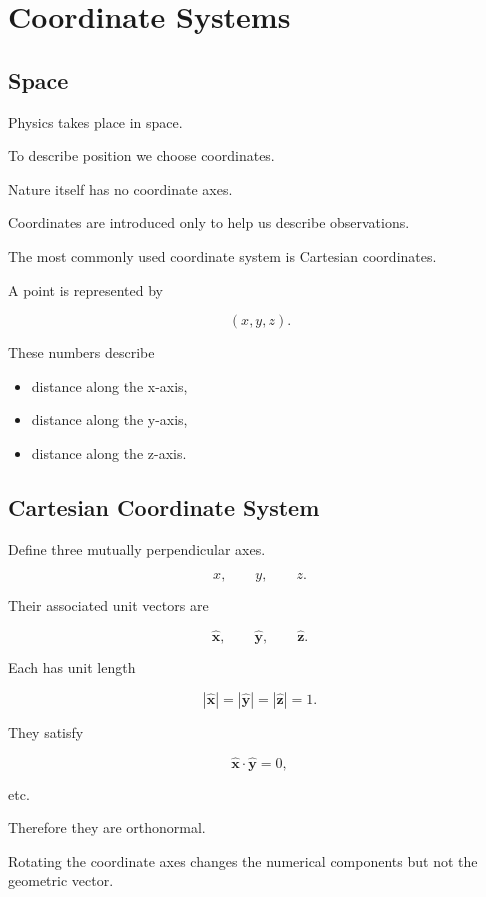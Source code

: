 \section{Coordinate Systems}
\label{sec:coordinate-systems}

\subsection{Space}

Physics takes place in space.

To describe position we choose coordinates.

Nature itself has no coordinate axes.

Coordinates are introduced only to help us describe observations.

The most commonly used coordinate system is Cartesian coordinates.

A point is represented by

\[
(x,y,z).
\]

These numbers describe

\begin{itemize}
	\item distance along the x-axis,
	\item distance along the y-axis,
	\item distance along the z-axis.
\end{itemize}


\subsection{Cartesian Coordinate System}

Define three mutually perpendicular axes.

\[
x,
\qquad
y,
\qquad
z.
\]

Their associated unit vectors are

\[
\hat{\mathbf x},
\qquad
\hat{\mathbf y},
\qquad
\hat{\mathbf z}.
\]

Each has unit length

\[
|\hat{\mathbf x}|=
|\hat{\mathbf y}|=
|\hat{\mathbf z}|=1.
\]

They satisfy

\[
\hat{\mathbf x}\cdot\hat{\mathbf y}=0,
\]

etc.

Therefore they are orthonormal.

\begin{bookfigure}{Rotating the coordinate axes changes the numerical components but not the geometric vector.}

\label{fig:coordinate-rotation}
\end{bookfigure}

